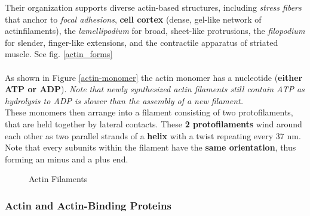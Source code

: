 \documentclass[../main.tex]{subfiles}
\begin{document}
Their organization supports diverse actin-based structures, including \textit{stress fibers} that anchor to \textit{focal adhesions}, \textbf{cell cortex} (dense, gel-like network of \gls{actinfilaments}), the \textit{lamellipodium} for broad, sheet-like protrusions, the \textit{filopodium} for slender, finger-like extensions, and the contractile apparatus of striated muscle. See fig. \ref{actin_forms} \\
\\
As shown in Figure \ref{actin-monomer} the actin monomer has a nucleotide (\textbf{either ATP or ADP}). \textit{Note that newly synthesized actin filaments still contain ATP as hydrolysis to ADP is slower than the assembly of a new filament.} \\
\indent These monomers then arrange into a filament consisting of two protofilaments, that are held together by lateral contacts. These \textbf{2 protofilaments} wind around each other as two parallel strands of a \textbf{helix} with a twist repeating every 37 nm. Note that every subunits within the filament have the \textbf{same orientation}, thus forming an minus and a plus end. 

\begin{figure}[H]
	\centering
	\caption{Actin Filaments}
\end{figure}

\subsubsection{Actin and Actin-Binding Proteins}
\end{document}
